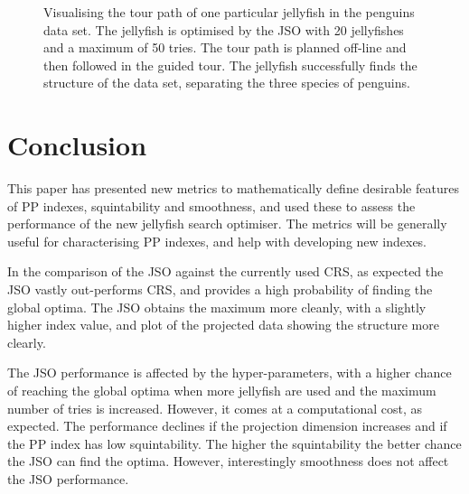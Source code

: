 \documentclass[
  12pt,
]{interact}
\theoremstyle{plain}
\begin{document}
\begin{figure}


\caption{\label{fig-jso-penguins}Visualising the tour path of one
particular jellyfish in the penguins data set. The jellyfish is
optimised by the JSO with 20 jellyfishes and a maximum of 50 tries. The
tour path is planned off-line and then followed in the guided tour. The
jellyfish successfully finds the structure of the data set, separating
the three species of penguins.}

\end{figure}%

\section{Conclusion}\label{sec-conclusion}

This paper has presented new metrics to mathematically define desirable
features of PP indexes, squintability and smoothness, and used these to
assess the performance of the new jellyfish search optimiser. The
metrics will be generally useful for characterising PP indexes, and help
with developing new indexes.

In the comparison of the JSO against the currently used CRS, as expected
the JSO vastly out-performs CRS, and provides a high probability of
finding the global optima. The JSO obtains the maximum more cleanly,
with a slightly higher index value, and plot of the projected data
showing the structure more clearly.

The JSO performance is affected by the hyper-parameters, with a higher
chance of reaching the global optima when more jellyfish are used and
the maximum number of tries is increased. However, it comes at a
computational cost, as expected. The performance declines if the
projection dimension increases and if the PP index has low
squintability. The higher the squintability the better chance the JSO
can find the optima. However, interestingly smoothness does not affect
the JSO performance.
\end{document}
